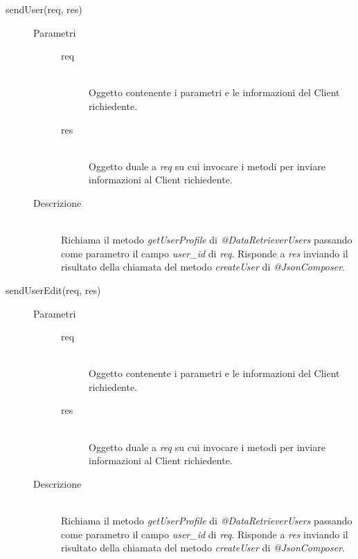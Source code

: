 \begin{description}
\begin{description}
    \item[sendUser(req, res)] \hfill
      \begin{description}
	\item[Parametri] \hfill
	  \begin{description}
	    \item[req] \hfill \\
	    Oggetto contenente i parametri e le informazioni del Client richiedente.
	    \item[res] \hfill \\
	    Oggetto duale a \textit{req} su cui invocare i metodi per inviare informazioni al Client richiedente.
	  \end{description}
	\item[Descrizione] \hfill \\
	Richiama il metodo \textit{getUserProfile} di \textit{@DataRetrieverUsers} passando come parametro il campo \textit{user\_id} di \textit{req}. Risponde a \textit{res} inviando il risultato della chiamata del metodo \textit{createUser} di \textit{@JsonComposer}.
      \end{description}
      
    \item[sendUserEdit(req, res)] \hfill
      \begin{description}
	\item[Parametri] \hfill
	  \begin{description}
	    \item[req] \hfill \\
	    Oggetto contenente i parametri e le informazioni del Client richiedente.
	    \item[res] \hfill \\
	    Oggetto duale a \textit{req} su cui invocare i metodi per inviare informazioni al Client richiedente.
	  \end{description}
	\item[Descrizione] \hfill \\
	Richiama il metodo \textit{getUserProfile} di \textit{@DataRetrieverUsers} passando come parametro il campo \textit{user\_id} di \textit{req}. Risponde a \textit{res} inviando il risultato della chiamata del metodo \textit{createUser} di \textit{@JsonComposer}.
      \end{description}
	

\end{description}
\end{description}

